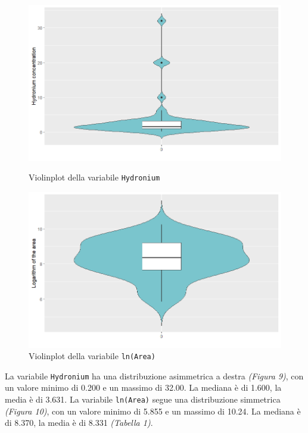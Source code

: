 \documentclass{article} %
\begin{document}
\begin{figure}[H]
    \centering
    \begin{minipage}{0.49\textwidth}
        \centering
        \includegraphics[width=\textwidth]{immagini/vp_hy.png}
        \captionsetup{justification=centering}
        \caption{Violinplot della variabile \texttt{Hydronium}}
    \end{minipage}
    \hfill
    \begin{minipage}{0.49\textwidth}
        \centering
        \includegraphics[width=\textwidth]{immagini/vp_ln.png}
        \captionsetup{justification=centering}
        \caption{Violinplot della variabile \texttt{ln(Area)}}
    \end{minipage}
\end{figure}
La variabile \texttt{Hydronium} ha una distribuzione asimmetrica a destra \textit{(Figura 9)}, con un valore minimo di 0.200 e un massimo di 32.00. La mediana è di 1.600, la media è di 3.631.
La variabile \texttt{ln(Area)} segue una distribuzione simmetrica \textit{(Figura 10)}, con un valore minimo di 5.855 e un massimo di 10.24. La mediana è di 8.370, la media è di 8.331 \textit{(Tabella 1)}.
\end{document}
